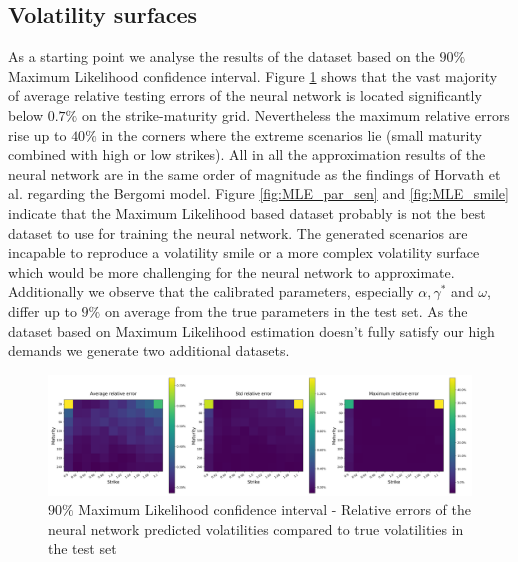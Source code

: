 \documentclass{article}
\begin{document}
\subsection{Volatility surfaces}\label{sec:vola_results}
As a starting point we analyse the results of the dataset based on the $90\%$ Maximum Likelihood confidence interval. Figure \ref{fig:MLE_NN_rel_err} shows that the vast majority of average relative testing errors of the neural network is located significantly below $0.7\%$ on the strike-maturity grid. Nevertheless the maximum relative errors rise up to $40\%$ in the corners where the extreme scenarios lie (small maturity combined with high or low strikes). All in all the approximation results of the neural network are in the same order of magnitude as the findings of Horvath et al. \cite{Blanka} regarding the Bergomi model. \newline
Figure \ref{fig:MLE_par_sen} and \ref{fig:MLE_smile} indicate that the Maximum Likelihood based dataset probably is not the best dataset to use for training the neural network. The generated scenarios are incapable to reproduce a volatility smile or a more complex volatility surface which would be more challenging for the neural network to approximate. Additionally we observe that the calibrated parameters, especially $\alpha, \gamma^*$ and $\omega$, differ up to $9\%$ on average from the true parameters in the test set. \newline
As the dataset based on Maximum Likelihood estimation doesn't fully satisfy our high demands we generate two additional datasets.
\newline 
\begin{figure}[!ht]
\centering
\includegraphics[width=\textwidth]{MLE_Vola_HNG_NNErrors.png}
\caption{$90\%$ Maximum Likelihood confidence interval - Relative errors of the neural network predicted volatilities compared to true volatilities in the test set}
\label{fig:MLE_NN_rel_err}
\end{figure}
\end{document}
